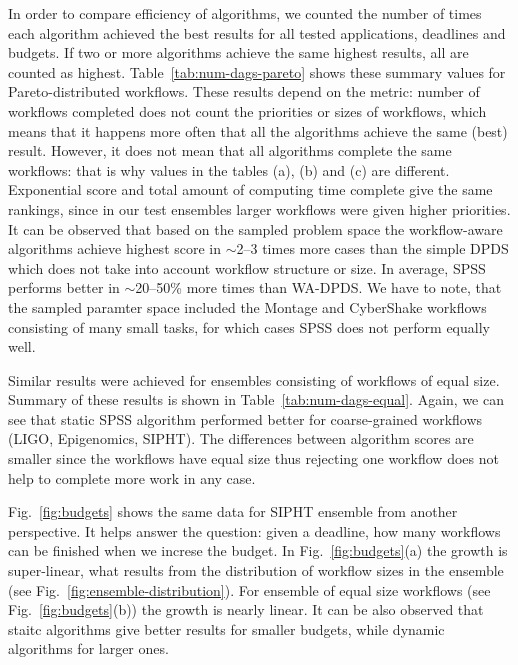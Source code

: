 \documentclass{sig-alternate}
\begin{document}
In order to compare efficiency of algorithms, we counted the number of times
each algorithm achieved the best results for all tested applications, deadlines
and budgets. If two or more algorithms achieve the same highest results, all are
counted as highest. Table~\ref{tab:num-dags-pareto} shows these summary values
for Pareto-distributed workflows. These results depend on the metric: number of
workflows completed does not count the priorities or sizes of workflows, which
means that it happens more often that all the algorithms achieve the same (best)
result. However, it does not mean that all algorithms complete the same
workflows: that is why values in the tables (a), (b) and (c) are different.
Exponential score and total amount of computing time complete give the same
rankings, since in our test ensembles larger workflows were given higher
priorities. It can be observed that based on the sampled problem space the
workflow-aware algorithms achieve highest score in $\sim$2--3 times more cases
than the simple DPDS which does not take into account workflow structure or
size. In average, SPSS performs better in $\sim$20--50\% more times than
WA-DPDS. We have to note, that the sampled paramter space included the Montage
and CyberShake workflows consisting of many small tasks, for which cases SPSS
does not perform equally well.


Similar results were achieved for ensembles consisting of workflows of equal
size. Summary of these results is shown in Table~\ref{tab:num-dags-equal}.
Again, we can see that static SPSS algorithm performed better for coarse-grained
workflows (LIGO, Epigenomics, SIPHT). The differences between algorithm scores
are smaller since the workflows have equal size thus rejecting one workflow
does not help to complete more work in any case.
               
               
Fig.~\ref{fig:budgets} shows the same data for SIPHT ensemble from another
perspective. It helps answer the question: given a deadline, how many workflows
can be finished when we increse the budget. In Fig.~\ref{fig:budgets}(a) the
growth is super-linear, what results from the distribution of workflow sizes in
the ensemble (see Fig.~\ref{fig:ensemble-distribution}). For ensemble of equal
size workflows (see Fig.~\ref{fig:budgets}(b)) the growth is nearly linear. It
can be also observed that staitc algorithms give better results for smaller
budgets, while dynamic algorithms for larger ones.
\end{document}
